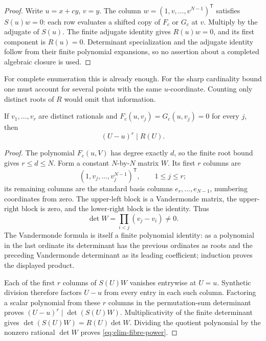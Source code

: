 \begin{proof}
Write \(u=x+cy\), \(v=y\).  The column
\(w=(1,v,\ldots,v^{N-1})^{\mathsf T}\) satisfies \(S(u)w=0\): each
row evaluates a shifted copy of \(F_c\) or \(G_c\) at \(v\).
Multiply by the adjugate of \(S(u)\).  The finite adjugate identity gives
\(R(u)w=0\), and its first component is \(R(u)=0\).
Determinant specialization and the adjugate identity follow from their
finite polynomial expansions, so no assertion about a completed
algebraic closure is used.
\end{proof}

For complete enumeration this is already enough.  For the sharp
cardinality bound one must account for several points with the same
\(u\)-coordinate.  Counting only distinct roots of \(R\) would omit
that information.

\begin{lemma}
\label{lem:elim-fibre}
If \(v_1,\ldots,v_r\) are distinct rationals and
\(F_c(u,v_j)=G_c(u,v_j)=0\) for every \(j\), then
\[
 (U-u)^r\mid R(U).
 \tag{E5}\label{eq:elim-fibre-power}
\]
\end{lemma}

\begin{proof}
The polynomial \(F_c(u,V)\) has degree exactly \(d\), so the finite
root bound gives \(r\le d\le N\).  Form a constant \(N\)-by-\(N\)
matrix \(W\).  Its first \(r\) columns are
\[
 (1,v_j,\ldots,v_j^{N-1})^{\mathsf T},\qquad 1\le j\le r;
\]
its remaining columns are the standard basis columns
\(e_r,\ldots,e_{N-1}\), numbering coordinates from zero.  The
upper-left block is a Vandermonde matrix, the upper-right block is zero,
and the lower-right block is the identity.  Thus
\[
 \det W=\prod_{i<j}(v_j-v_i)\ne0.
\]
The Vandermonde formula is itself a finite polynomial identity: as a
polynomial in the last ordinate its determinant has the previous
ordinates as roots and the preceding Vandermonde determinant as its
leading coefficient; induction proves the displayed product.

Each of the first \(r\) columns of \(S(U)W\) vanishes entrywise at
\(U=u\).  Synthetic division therefore factors \(U-u\) from every
entry in each such column.  Factoring a scalar polynomial from these
\(r\) columns in the permutation-sum determinant proves
\((U-u)^r\mid\det(S(U)W)\).  Multiplicativity of the finite determinant
gives \(\det(S(U)W)=R(U)\det W\).  Dividing the quotient polynomial by
the nonzero rational \(\det W\) proves \eqref{eq:elim-fibre-power}.
\end{proof}

